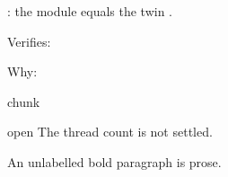 \documentclass[letterpaper,10pt,english]{sphinxmanual}
\begin{document}
\sphinxAtStartPar
{}: the module  equals the twin .

\sphinxAtStartPar
Verifies: {\hyperref[\detokenize{core/core:core.rotation}]{}}

\sphinxAtStartPar
Why: {\hyperref[\detokenize{core/core:why-1}]{}}

\begin{sphinxuseclass}{chunk}
\begin{sphinxuseclass}{open}
\sphinxAtStartPar
{} The thread count is not settled.

\end{sphinxuseclass}
\end{sphinxuseclass}
\sphinxAtStartPar
{} An unlabelled bold paragraph is prose.
\end{document}
